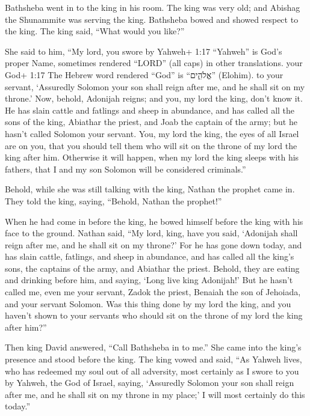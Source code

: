  Bathsheba went in to the king in his room. The king was
very old; and Abishag the Shunammite was serving the king. 
Bathsheba bowed and showed respect to the king. The king said, ``What
would you like?''

 She said to him, ``My lord, you swore by Yahweh+ 1:17
``Yahweh'' is God's proper Name, sometimes rendered ``LORD'' (all caps)
in other translations. your God+ 1:17 The Hebrew word rendered ``God''
is ``אֱלֹהִ֑ים'' (Elohim). to your servant, `Assuredly Solomon your son
shall reign after me, and he shall sit on my throne.'  Now,
behold, Adonijah reigns; and you, my lord the king, don't know it.
 He has slain cattle and fatlings and sheep in abundance,
and has called all the sons of the king, Abiathar the priest, and Joab
the captain of the army; but he hasn't called Solomon your servant.
 You, my lord the king, the eyes of all Israel are on you,
that you should tell them who will sit on the throne of my lord the king
after him.  Otherwise it will happen, when my lord the king
sleeps with his fathers, that I and my son Solomon will be considered
criminals.''

 Behold, while she was still talking with the king, Nathan
the prophet came in.  They told the king, saying, ``Behold,
Nathan the prophet!''

When he had come in before the king, he bowed himself before the king
with his face to the ground.  Nathan said, ``My lord, king,
have you said, `Adonijah shall reign after me, and he shall sit on my
throne?'  For he has gone down today, and has slain cattle,
fatlings, and sheep in abundance, and has called all the king's sons,
the captains of the army, and Abiathar the priest. Behold, they are
eating and drinking before him, and saying, `Long live king Adonijah!'
 But he hasn't called me, even me your servant, Zadok the
priest, Benaiah the son of Jehoiada, and your servant Solomon.
 Was this thing done by my lord the king, and you haven't
shown to your servants who should sit on the throne of my lord the king
after him?''

 Then king David answered, ``Call Bathsheba in to me.'' She
came into the king's presence and stood before the king. 
The king vowed and said, ``As Yahweh lives, who has redeemed my soul out
of all adversity,  most certainly as I swore to you by
Yahweh, the God of Israel, saying, `Assuredly Solomon your son shall
reign after me, and he shall sit on my throne in my place;' I will most
certainly do this today.''

